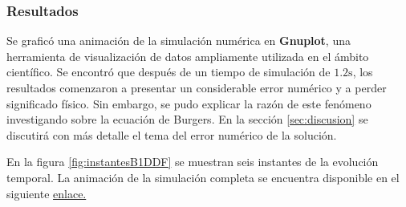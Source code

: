 \documentclass[12pt]{article}
\begin{document}
	\subsubsection{Resultados}
	Se graficó una animación de la simulación numérica en \textbf{Gnuplot}, una herramienta de visualización de datos ampliamente utilizada en el ámbito científico. Se encontró que después de un tiempo de simulación de $1.2\unit{\second}$, los resultados comenzaron a presentar un considerable error numérico y a perder significado físico. Sin embargo, se pudo explicar la razón de este fenómeno investigando sobre la ecuación de Burgers. En la sección \ref{sec:discusion} se discutirá con más detalle el tema del error numérico de la solución.
	
	En la figura \ref{fig:instantesB1DDF} se muestran seis instantes de la evolución temporal. La animación de la simulación completa se encuentra disponible en el siguiente \href{https://github.com/highchen147/practicas/blob/main/burgers1DDF/results/simu.mp4}{enlace.}
	
\end{document}

